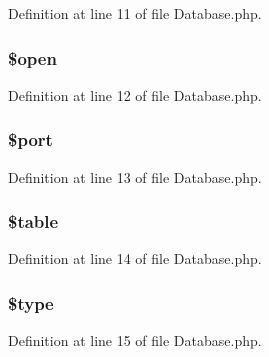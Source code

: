 Definition at line 11 of file Database.\+php.

\hypertarget{class_database_a4269f690c0554ecb1deec21b80f321dc}{}
\subsubsection[{\$open}]{\setlength{\rightskip}{0pt plus 5cm}\$open\hspace{0.3cm}{\ttfamily [protected]}}\label{class_database_a4269f690c0554ecb1deec21b80f321dc}


Definition at line 12 of file Database.\+php.

\hypertarget{class_database_aa0787efab4b22e8a212882f3409d4c77}{}
\subsubsection[{\$port}]{\setlength{\rightskip}{0pt plus 5cm}\$port\hspace{0.3cm}{\ttfamily [protected]}}\label{class_database_aa0787efab4b22e8a212882f3409d4c77}


Definition at line 13 of file Database.\+php.

\hypertarget{class_database_ae8876a14058f368335baccf35af4a22b}{}
\subsubsection[{\$table}]{\setlength{\rightskip}{0pt plus 5cm}\$table\hspace{0.3cm}{\ttfamily [protected]}}\label{class_database_ae8876a14058f368335baccf35af4a22b}


Definition at line 14 of file Database.\+php.

\hypertarget{class_database_a9a4a6fba2208984cabb3afacadf33919}{}
\subsubsection[{\$type}]{\setlength{\rightskip}{0pt plus 5cm}\$type\hspace{0.3cm}{\ttfamily [protected]}}\label{class_database_a9a4a6fba2208984cabb3afacadf33919}


Definition at line 15 of file Database.\+php.


